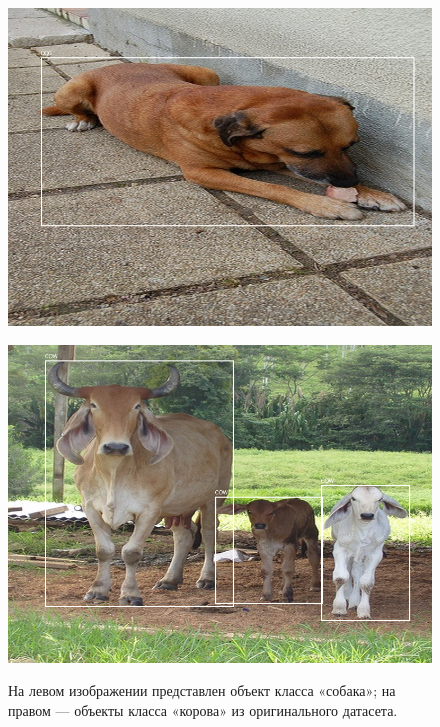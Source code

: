\begin{figure}[htp]
  \centering

  \begin{minipage}[t]{0.4\textwidth}
    \centering
    \includegraphics[width=\linewidth]{images/000036.png}
    \label{fig:img1}
  \end{minipage}%
  \hspace{0.05\textwidth}%
  \begin{minipage}[t]{0.4\textwidth}
    \centering
    \includegraphics[width=\linewidth]{images/001299.png}
    \label{fig:img1}
  \end{minipage}

  \caption{На левом изображении представлен объект класса «собака»; на правом — объекты класса «корова» из оригинального датасета.}
  \label{fig:comparison}
\end{figure}

